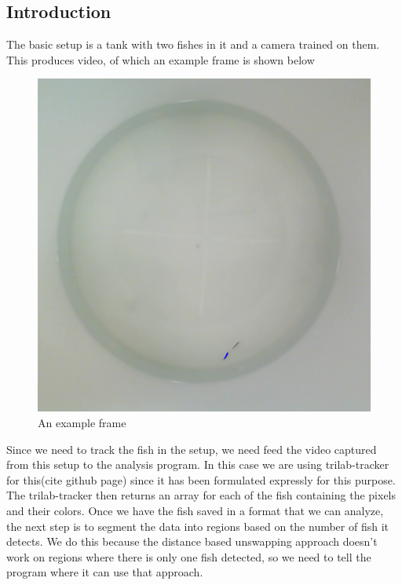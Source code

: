 \documentclass{article}
\begin{document}
\subsection{Introduction}
The basic setup is a tank with two fishes in it and a camera trained on them. This produces video, of which an example frame is shown below

\begin{figure}[H]
	\centering
	\includegraphics[width=.75\linewidth]{fish}
	\caption{An example frame}
\end{figure}

Since we need to track the fish in the setup, we need feed the video captured from this setup to the analysis program. In this case we are using trilab-tracker for this(cite github page) since it has been formulated expressly for this purpose. The trilab-tracker then returns an array for each of the fish containing the pixels and their colors. Once we have the fish saved in a format that we can analyze, the next step is to segment the data into regions based on the number of fish it detects. We do this because the distance based unswapping approach doesn't work on regions where there is only one fish detected, so we need to tell the program where it can use that approach.
\end{document}
